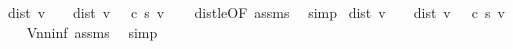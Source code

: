 \begin{isabellebody}
\isamarkupfalse%
\isanewline
{}\isamarkupfalse%
\ {\isachardoublequoteopen}dist\ v\ {\isacharequal}\ {\isasyminfinity}\ {\isasymLongrightarrow}\ dist\ v\ {\isacharequal}\ {\isasymmu}\ c\ s\ v{\isachardoublequoteclose}\isanewline
\ \ \isamarkupfalse%
\ dist{\isacharunderscore}le{\isacharunderscore}{\isasymmu}{\isacharbrackleft}OF\ assms{\isacharbrackright}\ \isamarkupfalse%
\ simp\isanewline
{}\isamarkupfalse%
\isanewline
{}\isamarkupfalse%
\ {\isachardoublequoteopen}dist\ v\ {\isacharequal}\ {\isacharminus}{\isasyminfinity}\ {\isasymLongrightarrow}\ dist\ v\ {\isacharequal}\ {\isasymmu}\ c\ s\ v{\isachardoublequoteclose}\isanewline
\ \ \isamarkupfalse%
\ Vn{\isacharunderscore}{\isasymmu}{\isacharunderscore}ninf\ assms\ \isamarkupfalse%
\ simp\isanewline
{}\isamarkupfalse%
%
\endisatagproof
{\isafoldproof}%
%
\isadelimproof
\isanewline
%
\endisadelimproof
%
\isadelimtheory
\isanewline
%
\endisadelimtheory
%
\isatagtheory
{}\isamarkupfalse%
%
\endisatagtheory
{\isafoldtheory}%
%
\isadelimtheory
%
\endisadelimtheory
\end{isabellebody}%
